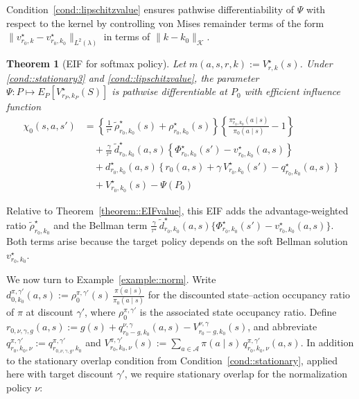 \documentclass[12pt]{article}
\theoremstyle{plain}
\newtheorem{theorem}{Theorem}
\begin{document}
Condition~\ref{cond::lipschitzvalue} ensures pathwise differentiability of
$\Psi$ with respect to the kernel by controlling von Mises remainder terms of
the form $\|v_{r_0,k}^\star-v_{r_0,k_0}^\star\|_{L^2(\lambda)}$ in terms of
$\|k-k_0\|_{\mathcal K}$.
 
\begingroup
 
 
\begin{theorem}[EIF for softmax policy]
\label{theorem::EIFsoftmax}
Let $m(a,s,r,k) := V_{r,k}^\star(s)$. Under \ref{cond::stationary3} and \ref{cond::lipschitzvalue}, the parameter $\Psi: P \mapsto E_P[V_{r_P,k_P}^\star(S)]$ is pathwise differentiable at $P_0$ with efficient influence function
\begin{align*}
   \chi_0(s,a,s')
&= \left\{\frac{1}{\tau^\star}\,\widetilde{\rho}_{r_0,k_0}^\star(s)
    + \rho_{r_0,k_0}^{\star}(s)\right\}
   \left\{\frac{\pi_{r_0,k_0}^\star(a\mid s)}{\pi_0(a\mid s)} - 1\right\} \\[4pt]
& \quad + \frac{\gamma}{\tau^\star}\,\widetilde{d}_{r_0,k_0}^\star(a,s)
   \left\{\Phi_{r_0,k_0}^\star(s')-v_{r_0,k_0}^\star(a,s)\right\} \\[4pt]
& \quad + d_{r_0,k_0}^\star(a,s)\,\Big\{\,r_0(a,s) + \gamma\,V_{r_0,k_0}^{\star}(s') - q_{r_0,k_0}^\star(a,s)\,\Big\} \\[4pt]
& \quad + V_{r_0,k_0}^\star(s) - \Psi(P_0)
\end{align*}

\end{theorem}
\endgroup
\noindent Relative to Theorem~\ref{theorem::EIFvalue}, this EIF adds the
advantage-weighted ratio $\widetilde{\rho}_{r_0,k_0}^\star$ and the Bellman
term
\(\tfrac{\gamma}{\tau^\star}\,\widetilde{d}_{r_0,k_0}^\star(a,s)
\{\Phi_{r_0,k_0}^\star(s') - v_{r_0,k_0}^\star(a,s)\}\).
Both terms arise because the target policy depends on the soft Bellman
solution \(v_{r_0,k_0}^\star\). 


We now turn to Example~\ref{example::norm}. Write
$d_{0,k_0}^{\pi,\gamma'}(a,s):=\rho_0^{\pi,\gamma'}(s)\,
\frac{\pi(a \mid s)}{\pi_0(a \mid s)}$ for the discounted state--action
occupancy ratio of \(\pi\) at discount \(\gamma'\), where
\(\rho_0^{\pi,\gamma'}\) is the associated state occupancy ratio. Define
$r_{0,\nu,\gamma,g}(a,s):=g(s)+q_{r_0-g,k_0}^{\nu,\gamma}(a,s)-
V_{r_0-g,k_0}^{\nu,\gamma}(s)$, and abbreviate
$q_{r_0,k_0,\nu}^{\pi,\gamma'}:=q_{r_{0,\nu,\gamma,g},k_0}^{\pi,\gamma'}$
and
$V_{r_0,k_0,\nu}^{\pi,\gamma'}(s):=\sum_{a\in\mathcal A}\pi(a\mid s)\,
q_{r_0,k_0,\nu}^{\pi,\gamma'}(a,s)$. In addition to the stationary overlap
condition from Condition~\ref{cond::stationary}, applied here with target
discount \(\gamma'\), we require stationary overlap for the normalization
policy \(\nu\):
\end{document}
